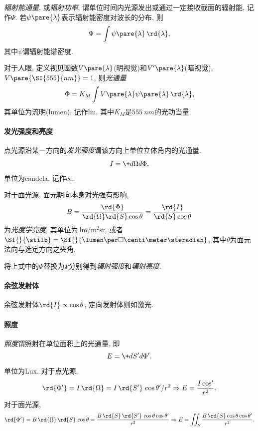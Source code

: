 \documentclass{ctexart}
\begin{document}
\emph{辐射能通量}, 或\emph{辐射功率}, 谓单位时间内光源发出或通过一定接收截面的辐射能, 记作$\Psi$. 若$\psi\pare{\lambda}$表示辐射能密度对波长的分布, 则
\[ \Psi = \int \psi\pare{\lambda}\,\rd{\lambda}, \]
其中$\psi$谓辐射能谱密度.
\par
对于人眼, 定义视见函数$V\pare{\lambda}$(明视觉)和$V'\pare{\lambda}$(暗视觉), $V\pare{\SI{555}{nm}} = 1$, 则\emph{光通量}
\[ \Phi = K_M \int V\pare{\lambda} \psi\pare{\lambda}\,\rd{\lambda}, \]
其单位为流明(lumen), 记作lm. 其中$K_M$是$\SI{555}{nm}$的光功当量.



\paragraph{发光强度和亮度} %
\label{par:发光强度和亮度}

点光源沿某一方向的\emph{发光强度}谓该方向上单位立体角内的光通量.
\[ I = \+d{\Omega}d{\Phi}. \]
单位为candela, 记作cd.
\par
对于面光源, 面元朝向本身对光强有影响,
\[ B = \frac{\rd{\Phi}}{\rd{\Omega}\rd{S}\cos\theta} = \frac{\rd{I}}{\rd{S}\cos\theta} \]
为\emph{光度学亮度}, 其单位为$\SI{}{\lumen\per\square\meter\steradian}$, 或者
$\SI{}{\stilb} = \SI{}{\lumen\per\square\centi\meter\steradian}$, 其中$\theta$为面元法向与选定方向之夹角.
\par
将上式中的$\Phi$替换为$\Psi$分别得到\emph{辐射强度}和\emph{辐射亮度}.


\paragraph{余弦发射体} %
\label{par:余弦发射体}

余弦发射体$\rd{I}\propto \cos\theta$, 定向发射体则如激光.


\paragraph{照度} %
\label{par:照度}

\emph{照度}谓照射在单位面积上的光通量, 即
\[ E = \+d{S'}d{\Phi'}. \]
单位为Lux. 对于点光源,
\[ \rd{\Phi'} = I\,\rd{\Omega} = I\,\rd{S'}\,\cos\theta' / r^2\Rightarrow E = \frac{I\cos'}{r^2}. \]
对于面光源,
\[ \rd{\Phi'} = B\,\rd{\Omega}\,\rd{S}\,\cos\theta = \frac{B\,\rd{S}\,\rd{S'}\,\cos\theta\cos\theta'}{r^2}\Rightarrow E= \iint_S \frac{B\,\rd{S} \cos\theta\cos\theta'}{r^2}. \]
\end{document}
